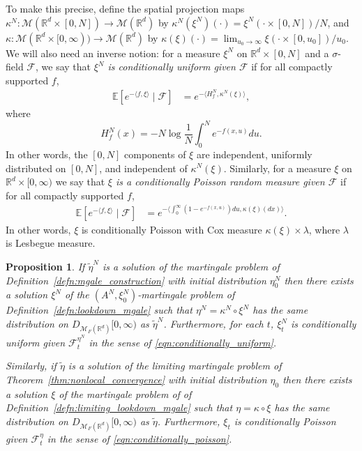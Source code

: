 \documentclass[12pt]{article}
\newtheorem{proposition}[theorem]{Proposition}
\def \tilde{\widetilde}
\newcommand{\IE}{\mathbb E}
\newcommand{\IR}{\mathbb R}
\newcommand{\lp}{\xi}              %
\newcommand{\measures}{\mathcal{M}_F(\IR^d)} %
\numberwithin{equation}{section}
\begin{document}
To make this precise,
define the spatial projection maps
$\kappa^N: \mathcal{M}(\IR^d \times [0, N]) \to \mathcal{M}(\IR^d)$
by $\kappa^N(\xi^N)(\cdot) = \xi^N(\cdot \times [0, N]) / N$,
and $\kappa: \mathcal{M}(\IR^d \times [0, \infty)) \to \mathcal{M}(\IR^d)$
by $\kappa(\xi)(\cdot) = \lim_{u_0 \to \infty} \xi(\cdot \times [0, u_0]) / u_0$.
We will also need an inverse notion:
for a measure $\lp^N$ on $\IR^d \times [0, N]$ and a $\sigma$-field $\mathcal{F}$,
we say that \emph{$\lp^N$ is conditionally uniform given $\mathcal{F}$}
if for all compactly supported $f$,
\begin{align} \label{eqn:conditionally_uniform}
    \IE[ e^{-\langle f, \lp \rangle} \;|\; \mathcal{F} ]
    &=
    e^{-\langle H_f^N, \kappa^N(\lp) \rangle} ,
\end{align}
where
$$ H_f^N(x) = - N \log \frac{1}{N} \int_0^N e^{-f(x, u)} du . $$
In other words, the $[0, N]$ components of $\lp$
are independent, uniformly distributed on $[0, N]$, and independent of 
$\kappa^N(\lp)$.
Similarly, for a measure $\lp$ on $\IR^d \times [0, \infty)$
we say that \emph{$\lp$ is a conditionally Poisson random measure given $\mathcal{F}$}
if for all compactly supported $f$,
\begin{align} \label{eqn:conditionally_poisson}
    \IE[ e^{-\langle f, \lp \rangle} \;|\; \mathcal{F} ]
    &=
    e^{-\langle \int_0^\infty (1 - e^{-f(x, u)}) du, \kappa(\lp)(dx) \rangle} .
\end{align}
In other words, $\lp$ is conditionally Poisson with Cox measure $\kappa(\lp) \times \lambda$,
where $\lambda$ is Lesbegue measure.

\begin{proposition}
    \label{thm:mmt_application}
    If $\tilde \eta^N$ is a solution
    of the martingale problem of Definition~\ref{defn:mgale_construction}
    with initial distribution $\eta^N_0$
    then there exists a solution $\lp^N$
    of the $(A^N, \lp^N_0)$-martingale problem of Definition~\ref{defn:lookdown_mgale}
    such that $\eta^N = \kappa^N \circ \lp^N$
    has the same distribution on $D_{\measures}[0, \infty)$
    as $\tilde \eta^N$.
    Furthermore, for each $t$, $\lp^N_t$ is conditionally uniform 
	given $\mathcal{F}^{\eta^N}_t$
    in the sense of \eqref{eqn:conditionally_uniform}.

    Similarly,
    if $\tilde \eta$ is a solution
    of the limiting martingale problem of Theorem~\ref{thm:nonlocal_convergence}
    with initial distribution $\eta_0$
    then there exists a solution $\lp$
    of the martingale problem of of Definition~\ref{defn:limiting_lookdown_mgale}
    such that $\eta = \kappa \circ \lp$
    has the same distribution on $D_{\measures}[0, \infty)$
    as $\tilde \eta$.
    Furthermore, $\lp_t$ is conditionally Poisson given $\mathcal{F}^{\eta}_t$
    in the sense of \eqref{eqn:conditionally_poisson}.
\end{proposition}
\end{document}
